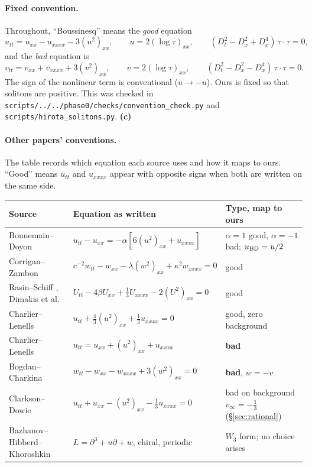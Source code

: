 \documentclass[11pt,a4paper]{article}
\newcommand{\Lc}{\textsf{\textbf{(c)}}}
\newcommand{\script}[1]{\texttt{scripts/#1}}
\theoremstyle{remark}
\begin{document}
\paragraph{Fixed convention.} Throughout, ``Boussinesq'' means the \emph{good} equation
\begin{equation}\label{eq:good}
u_{tt}=u_{xx}-u_{xxxx}-3(u^2)_{xx},\qquad u=2(\log\tau)_{xx},\qquad (D_t^2-D_x^2+D_x^4)\,\tau\cdot\tau=0 ,
\end{equation}
and the \emph{bad} equation is
\begin{equation}\label{eq:bad}
v_{tt}=v_{xx}+v_{xxxx}+3(v^2)_{xx},\qquad v=2(\log\tau)_{xx},\qquad (D_t^2-D_x^2-D_x^4)\,\tau\cdot\tau=0 .
\end{equation}
The sign of the nonlinear term is conventional ($u\to-u$). Ours is fixed so that solitons are positive. This was checked in \script{../../phase0/checks/convention\_check.py} and \script{hirota\_solitons.py}. \Lc

\paragraph{Other papers' conventions.} The table records which equation each source uses and how it maps to ours. ``Good'' means $u_{tt}$ and $u_{xxxx}$ appear with opposite signs when both are written on the same side.

\begin{center}\small
\begin{tabular}{@{}p{4.6cm}p{6.4cm}p{3.6cm}@{}}
\toprule
Source & Equation as written & Type, map to ours\\\midrule
Bonnemain--Doyon \cite{BD} & $u_{tt}-u_{xx}=-\alpha[6(u^2)_{xx}+u_{xxxx}]$ & $\alpha=1$ good, $\alpha=-1$ bad; $u_{\rm BD}=u/2$\\
Corrigan--Zambon \cite{CZ} & $c^{-2}w_{tt}-w_{xx}-\lambda(w^2)_{xx}+\kappa^2w_{xxxx}=0$ & good\\
Rasin--Schiff \cite{RS}, Dimakis et al.\ \cite{DMHC} & $U_{tt}-4\beta U_{xx}+\tfrac13U_{xxxx}-2(U^2)_{xx}=0$ & good\\
Charlier--Lenells \cite{CL-GB} & $u_{tt}+\tfrac43(u^2)_{xx}+\tfrac13u_{xxxx}=0$ & good, zero background\\
Charlier--Lenells \cite{CL-WW,CL-SOL,CL-SR} & $u_{tt}=u_{xx}+(u^2)_{xx}+u_{xxxx}$ & \textbf{bad}\\
Bogdan--Charkina \cite{BC} & $w_{tt}-w_{xx}-w_{xxxx}+3(w^2)_{xx}=0$ & \textbf{bad}, $w=-v$\\
Clarkson--Dowie \cite{CD} & $u_{tt}+u_{xx}-(u^2)_{xx}-\tfrac13u_{xxxx}=0$ & bad on background $v_\infty=-\tfrac13$ (\S\ref{sec:rational})\\
Bazhanov--Hibberd--Khoroshkin \cite{BHK} & $L=\partial^3+u\partial+w$, chiral, periodic & $W_3$ form; no choice arises\\
\bottomrule
\end{tabular}
\end{center}
\end{document}
